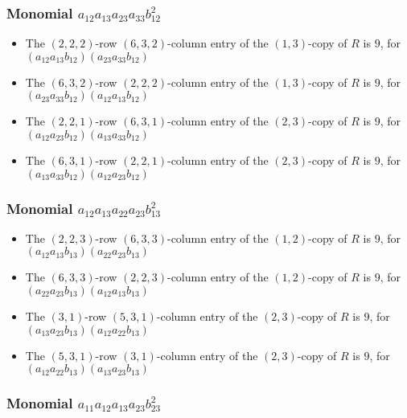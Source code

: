 \documentclass{article}
\begin{document}
\subsubsection{Monomial $ a_{12} a_{13} a_{23} a_{33} b_{12}^{2} $}

\begin{itemize}
\item The $(2, 2, 2)$-row $(6, 3, 2)$-column entry of the $ \left(1, 3\right) $-copy of $R$ is $ 9 $, for $( a_{12} a_{13} b_{12} )( a_{23} a_{33} b_{12} )$ 
\item The $(6, 3, 2)$-row $(2, 2, 2)$-column entry of the $ \left(1, 3\right) $-copy of $R$ is $ 9 $, for $( a_{23} a_{33} b_{12} )( a_{12} a_{13} b_{12} )$ 
\item The $(2, 2, 1)$-row $(6, 3, 1)$-column entry of the $ \left(2, 3\right) $-copy of $R$ is $ 9 $, for $( a_{12} a_{23} b_{12} )( a_{13} a_{33} b_{12} )$ 
\item The $(6, 3, 1)$-row $(2, 2, 1)$-column entry of the $ \left(2, 3\right) $-copy of $R$ is $ 9 $, for $( a_{13} a_{33} b_{12} )( a_{12} a_{23} b_{12} )$ 
\end{itemize}
\subsubsection{Monomial $ a_{12} a_{13} a_{22} a_{23} b_{13}^{2} $}

\begin{itemize}
\item The $(2, 2, 3)$-row $(6, 3, 3)$-column entry of the $ \left(1, 2\right) $-copy of $R$ is $ 9 $, for $( a_{12} a_{13} b_{13} )( a_{22} a_{23} b_{13} )$ 
\item The $(6, 3, 3)$-row $(2, 2, 3)$-column entry of the $ \left(1, 2\right) $-copy of $R$ is $ 9 $, for $( a_{22} a_{23} b_{13} )( a_{12} a_{13} b_{13} )$ 
\item The $(3, 1)$-row $(5, 3, 1)$-column entry of the $ \left(2, 3\right) $-copy of $R$ is $ 9 $, for $( a_{13} a_{23} b_{13} )( a_{12} a_{22} b_{13} )$ 
\item The $(5, 3, 1)$-row $(3, 1)$-column entry of the $ \left(2, 3\right) $-copy of $R$ is $ 9 $, for $( a_{12} a_{22} b_{13} )( a_{13} a_{23} b_{13} )$ 
\end{itemize}
\subsubsection{Monomial $ a_{11} a_{12} a_{13} a_{23} b_{23}^{2} $}
\end{document}
